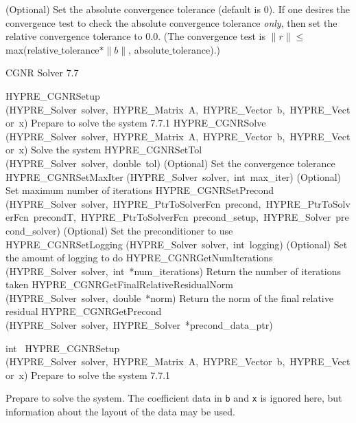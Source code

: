 \documentclass{article}
\begin{document}
\begin{cxxentry}
\begin{cxxentry}
\begin{cxxfunction}
\begin{cxxdoc}
(Optional) Set the absolute convergence tolerance (default is 0). 
If one desires
the convergence test to check the absolute convergence tolerance {\it only}, then
set the relative convergence tolerance to 0.0.  (The convergence test is 
$\|r\| \leq$ max(relative$\_$tolerance$\ast \|b\|$, absolute$\_$tolerance).)

\end{cxxdoc}
\end{cxxfunction}
\end{cxxentry}
\begin{cxxentry}
{}
        {CGNR Solver}
        {}
        {
}
        {7.7}
\begin{cxxnames}
        {HYPRE\_CGNRSetup}
        {(HYPRE\_Solver\ solver,\ HYPRE\_Matrix\ A,\ HYPRE\_Vector\ b,\ HYPRE\_Vector\ x)}
        {
Prepare to solve the system}
        {7.7.1}
        {HYPRE\_CGNRSolve}
        {(HYPRE\_Solver\ solver,\ HYPRE\_Matrix\ A,\ HYPRE\_Vector\ b,\ HYPRE\_Vector\ x)}
        {
Solve the system}
        {}
\label{cxx.7.7.2}
        {HYPRE\_CGNRSetTol}
        {(HYPRE\_Solver\ solver,\ double\ tol)}
        {
(Optional) Set the convergence tolerance}
        {}
\label{cxx.7.7.3}
        {HYPRE\_CGNRSetMaxIter}
        {(HYPRE\_Solver\ solver,\ int\ max\_iter)}
        {
(Optional) Set maximum number of iterations}
        {}
\label{cxx.7.7.4}
        {HYPRE\_CGNRSetPrecond}
        {(HYPRE\_Solver\ solver,\ HYPRE\_PtrToSolverFcn\ precond,\ HYPRE\_PtrToSolverFcn\ precondT,\ HYPRE\_PtrToSolverFcn\ precond\_setup,\ HYPRE\_Solver\ precond\_solver)}
        {
(Optional) Set the preconditioner to use}
        {}
\label{cxx.7.7.5}
        {HYPRE\_CGNRSetLogging}
        {(HYPRE\_Solver\ solver,\ int\ logging)}
        {
(Optional) Set the amount of logging to do}
        {}
\label{cxx.7.7.6}
        {HYPRE\_CGNRGetNumIterations}
        {(HYPRE\_Solver\ solver,\ int\ *num\_iterations)}
        {
Return the number of iterations taken}
        {}
\label{cxx.7.7.7}
        {HYPRE\_CGNRGetFinalRelativeResidualNorm}
        {(HYPRE\_Solver\ solver,\ double\ *norm)}
        {
Return the norm of the final relative residual}
        {}
\label{cxx.7.7.8}
        {HYPRE\_CGNRGetPrecond}
        {(HYPRE\_Solver\ solver,\ HYPRE\_Solver\ *precond\_data\_ptr)}
        {}
        {}
\label{cxx.7.7.9}
\end{cxxnames}
\begin{cxxfunction}
{int\ }
        {HYPRE\_CGNRSetup}
        {(HYPRE\_Solver\ solver,\ HYPRE\_Matrix\ A,\ HYPRE\_Vector\ b,\ HYPRE\_Vector\ x)}
        {
Prepare to solve the system}
        {7.7.1}
\begin{cxxdoc}

Prepare to solve the system.  The coefficient data in {\tt b} and {\tt x} is
ignored here, but information about the layout of the data may be used.
\end{cxxdoc}
\end{cxxfunction}
\end{cxxentry}
\end{cxxentry}
\end{document}
